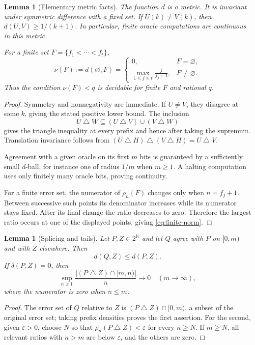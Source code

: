 \documentclass[11pt,a4paper]{article}
\newcommand{\N}{\mathbb N}
\newcommand{\Cantor}{2^{\N}}
\newcommand{\sdelta}{\mathbin{\triangle}}
\newtheorem{lemma}[theorem]{Lemma}
\theoremstyle{definition}\newtheorem{definition}[theorem]{Definition}
\theoremstyle{remark}\newtheorem{remark}[theorem]{Remark}
\begin{document}
\begin{lemma}[Elementary metric facts]\label{lem:metric}
The function $d$ is a metric. It is invariant under symmetric difference with a fixed set. If $U(k)\ne V(k)$, then $d(U,V)\ge1/(k+1)$. In particular, finite oracle computations are continuous in this metric.

For a finite set $F=\{f_1<\cdots<f_t\}$,
\begin{equation}\label{eq:finite-norm}
 \nu(F):=d(\varnothing,F)=
 \begin{cases}
 0,&F=\varnothing,\\
 \displaystyle\max_{1\le j\le t}\frac{j}{f_j+1},&F\ne\varnothing.
 \end{cases}
\end{equation}
Thus the condition $\nu(F)<q$ is decidable for finite $F$ and rational $q$.
\end{lemma}
\begin{proof}
Symmetry and nonnegativity are immediate. If $U\ne V$, they disagree at some $k$, giving the stated positive lower bound. The inclusion
\[
 U\sdelta W\subseteq(U\sdelta V)\cup(V\sdelta W)
\]
gives the triangle inequality at every prefix and hence after taking the supremum. Translation invariance follows from
$(U\sdelta H)\sdelta(V\sdelta H)=U\sdelta V$.

Agreement with a given oracle on its first $m$ bits is guaranteed by a sufficiently small $d$-ball, for instance one of radius $1/m$ when $m\ge1$. A halting computation uses only finitely many oracle bits, proving continuity.

For a finite error set, the numerator of $\rho_n(F)$ changes only when $n=f_j+1$. Between successive such points its denominator increases while its numerator stays fixed. After its final change the ratio decreases to zero. Therefore the largest ratio occurs at one of the displayed points, giving \eqref{eq:finite-norm}.
\end{proof}

\begin{lemma}[Splicing and tails]\label{lem:splicing}
Let $P,Z\in\Cantor$ and let $Q$ agree with $P$ on $[0,m)$ and with $Z$ elsewhere. Then
\[
 d(Q,Z)\le d(P,Z).
\]
If $\delta(P,Z)=0$, then
\begin{equation}\label{eq:tailnorm}
 \sup_{n\ge1}\frac{|(P\sdelta Z)\cap[m,n)|}{n}\longrightarrow0
 \quad(m\to\infty),
\end{equation}
where the numerator is zero when $n\le m$.
\end{lemma}
\begin{proof}
The error set of $Q$ relative to $Z$ is $(P\sdelta Z)\cap[0,m)$, a subset of the original error set; taking prefix densities proves the first assertion. For the second, given $\varepsilon>0$, choose $N$ so that $\rho_n(P\sdelta Z)<\varepsilon$ for every $n\ge N$. If $m\ge N$, all relevant ratios with $n>m$ are below $\varepsilon$, and the others are zero.
\end{proof}
\end{document}
